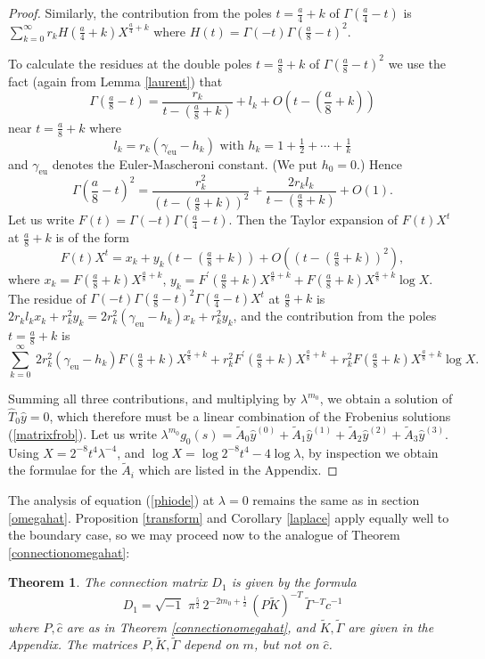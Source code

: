 \documentclass[a4paper,12pt,leqno]{amsart}
\numberwithin{equation}{section}
\theoremstyle{plain}
\newtheorem{theorem}{Theorem}[section]
\theoremstyle{definition}
\newcommand{\la}{\lambda}
\newcommand{\Ga}{\Gamma}
\newcommand{\pr}{\prime}
\newcommand{\ii}{ {\scriptstyle\sqrt{-1}}\, }
\newcommand{\nn}{m}
\newcommand{\Asharp}{\Ga}
\newcommand{\euler}{\gamma_{\scriptscriptstyle\text{eu}}}
\begin{document}
{\begin{proof}
Similarly, the contribution from the poles $t=\tfrac a4 + k$ of $\Ga(\tfrac a4 - t)$ 
is
$
\sum_{k=0}^\infty r_k H(\tfrac a4 + k) X^{\frac a4+k}
$
where 
$H(t)=\Ga(-t)\Ga(\tfrac {a}8 - t)^2$. 

To calculate the residues at the double poles $t=\tfrac a8 + k$ of $\Ga(\tfrac {a}8 - t)^2$ we use the fact (again from Lemma \ref{laurent}) that
\[
\textstyle
\Ga(\tfrac a8-t)=\frac{r_k}{t - (\frac a8+k)} + l_k + O(t - (\frac a8+k))
\]
near $t=\frac a8 + k$ where 
\[
\text{$l_k=r_k(\euler-h_k)$ with $h_k=1+\tfrac 12+\cdots+\tfrac1k$
}
\]
and $\euler$ denotes the Euler-Mascheroni constant. (We put $h_0=0$.)
Hence
\[
\textstyle
\Ga(\frac {a}8 - t)^2=
\frac{r_k^2}{(t - (\frac a8+k))^{2}} + \frac{2r_k l_k}{t - (\frac a8+k)} + 
O(1).
\]
Let us write $F(t)=\Ga(-t)\Ga(\tfrac a4-t)$.  Then the Taylor expansion of $F(t)X^t$ at $\tfrac a8 + k$ is of the form
\[
F(t)X^t=x_k + y_k (t - (\tfrac a8+k)) + O( (t - (\tfrac a8+k))^2 ),
\]
where
$x_k=F(\tfrac a8+k)X^{\frac a8 + k}$, 
$y_k=F^\pr(\tfrac a8+k)X^{\frac a8 + k} + F(\tfrac a8+k)X^{\frac a8 + k} \log X$.  
The residue of 
$\Ga( - t)\Ga(\tfrac {a}8 - t)^2\Ga(\tfrac {a}4 - t)X^t$
at $\tfrac a8 + k$ is $2r_kl_kx_k + r_k^2 y_k=2r_k^2(\euler - h_k)x_k + r_k^2 y_k$, and the contribution from the poles $t=\tfrac a8+k$ is
\[
\sum_{k=0}^\infty \  2r_k^2 (\euler-h_k) F(\tfrac a8+k) X^{\frac a8 + k}
+
r_k^2  F^\pr(\tfrac a8+k)  X^{\frac a8 + k}
+
r_k^2  F(\tfrac a8+k) X^{\frac a8 + k}\log X.
\]

Summing all three contributions, and multiplying by $\la^{\nn_0}$,
we obtain a solution of 
$\hat T_0 \hat y=0$, which therefore must be a linear combination of
the Frobenius solutions (\ref{matrixfrob}). Let us write
$\la^{\nn_0}g_0(s)=\tilde A_0 \hat y^{(0)}+\tilde A_1 \hat y^{(1)}+\tilde A_2 \hat y^{(2)}+\tilde A_3 \hat y^{(3)}$.
Using $X=2^{-8} t^4 \la^{-4}$, and $\log X= \log 2^{-8} t^4 - 4 \log\la$,
by inspection we obtain the formulae for the $\tilde A_i$ which are listed in the Appendix.
\end{proof}

The analysis of equation (\ref{phiode}) at $\la=0$ remains the same as in section 
\ref{omegahat}. Proposition \ref{transform} and Corollary \ref{laplace} apply equally well to the boundary case, so we may proceed now to the analogue of 
Theorem \ref{connectionomegahat}:

\begin{theorem}\label{Rconnectionomegahat} The connection matrix $D_1$ is given by the formula
\[
D_1=
\ii \, \pi^{\frac52} \, 2^{-2\nn_0+\frac12}\,  (P\tilde K)^{-T}\, 
{\tilde \Asharp}{}^{-T} \hat c^{-1}
\]
where $P,\hat c$ are as in Theorem \ref{connectionomegahat}, and
$\tilde K, \tilde\Asharp$ are given in the Appendix.
The matrices $P, \tilde K, \tilde \Asharp$ depend on $m$, but not on $\hat c$.
\end{theorem}

}
\end{document}
